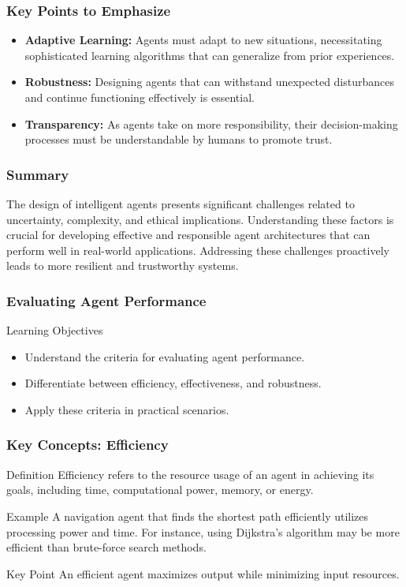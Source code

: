 \documentclass[aspectratio=169]{beamer}
\begin{document}
\begin{frame}[fragile]
    \frametitle{Key Points to Emphasize}
    \begin{itemize}
        \item \textbf{Adaptive Learning:} Agents must adapt to new situations, necessitating sophisticated learning algorithms that can generalize from prior experiences.
        \item \textbf{Robustness:} Designing agents that can withstand unexpected disturbances and continue functioning effectively is essential.
        \item \textbf{Transparency:} As agents take on more responsibility, their decision-making processes must be understandable by humans to promote trust.
    \end{itemize}
\end{frame}

\begin{frame}[fragile]
    \frametitle{Summary}
    The design of intelligent agents presents significant challenges related to uncertainty, complexity, and ethical implications. Understanding these factors is crucial for developing effective and responsible agent architectures that can perform well in real-world applications. Addressing these challenges proactively leads to more resilient and trustworthy systems.
\end{frame}

\begin{frame}[fragile]
    \frametitle{Evaluating Agent Performance}
    \begin{block}{Learning Objectives}
        \begin{itemize}
            \item Understand the criteria for evaluating agent performance.
            \item Differentiate between efficiency, effectiveness, and robustness.
            \item Apply these criteria in practical scenarios.
        \end{itemize}
    \end{block}
\end{frame}

\begin{frame}[fragile]
    \frametitle{Key Concepts: Efficiency}
    \begin{block}{Definition}
        Efficiency refers to the resource usage of an agent in achieving its goals, including time, computational power, memory, or energy.
    \end{block}
    \begin{block}{Example}
        A navigation agent that finds the shortest path efficiently utilizes processing power and time. For instance, using Dijkstra's algorithm may be more efficient than brute-force search methods.
    \end{block}
    \begin{block}{Key Point}
        An efficient agent maximizes output while minimizing input resources.
    \end{block}
\end{frame}
\end{document}
